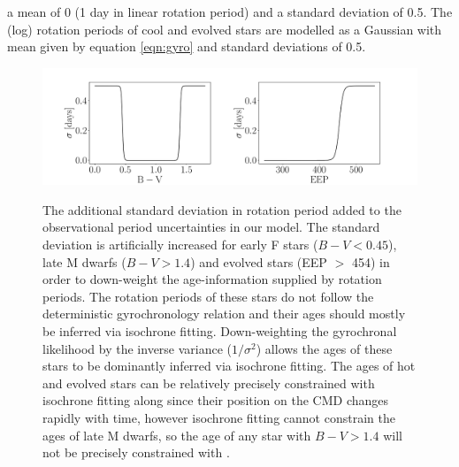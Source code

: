 a mean of 0 (1 day in linear rotation period) and a standard deviation of
0.5.
The (log) rotation periods of cool and evolved stars are modelled as a
Gaussian with mean given by equation \ref{eqn:gyro} and standard deviations of
0.5.
\begin{figure}
  \caption{
    The additional standard deviation in rotation period added to the
    observational period uncertainties in our model.
    The standard deviation is artificially increased for early F stars ($B-V <
    0.45$), late M dwarfs ($B-V > 1.4$) and evolved stars (EEP $>$ 454) in
    order to down-weight the age-information supplied by rotation periods.
    The rotation periods of these stars do not follow the deterministic
    gyrochronology relation and their ages should mostly be inferred via
    isochrone fitting.
    Down-weighting the gyrochronal likelihood by the inverse variance
    ($1/\sigma^2$) allows the ages of these stars to be dominantly inferred
    via isochrone fitting.
    The ages of hot and evolved stars can be relatively precisely constrained
    with isochrone fitting along since their position on the CMD changes
    rapidly with time, however isochrone fitting cannot constrain the ages of
    late M dwarfs, so the age of any star with $B-V > 1.4$ will not be
    precisely constrained with \sd.
}
  \centering
    \includegraphics[width=1.\textwidth]{variance}
\label{fig:variance}
\end{figure}


